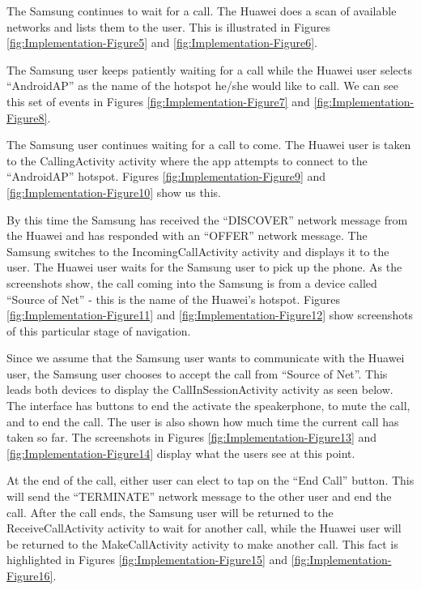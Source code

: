\documentclass[12pt,svgnames,smaller]{article} %
\begin{document}
		The Samsung continues to wait for a call. The Huawei does a scan of available networks and lists them to the user. This is illustrated in Figures \ref{fig:Implementation-Figure5} and \ref{fig:Implementation-Figure6}.

		The Samsung user keeps patiently waiting for a call while the Huawei user selects “AndroidAP” as the name of the hotspot he/she would like to call. We can see this set of events in Figures \ref{fig:Implementation-Figure7} and \ref{fig:Implementation-Figure8}.
	
		The Samsung user continues waiting for a call to come. The Huawei user is taken to the CallingActivity activity where the app attempts to connect to the “AndroidAP” hotspot. Figures \ref{fig:Implementation-Figure9} and \ref{fig:Implementation-Figure10} show us this.

		By this time the Samsung has received the “DISCOVER” network message from the Huawei and has responded with an “OFFER” network message. The Samsung switches to the IncomingCallActivity activity and displays it to the user. The Huawei user waits for the Samsung user to pick up the phone. As the screenshots show, the call coming into the Samsung is from a device called “Source of Net” - this is the name of the Huawei’s hotspot. Figures \ref{fig:Implementation-Figure11} and \ref{fig:Implementation-Figure12} show screenshots of this particular stage of navigation.

		Since we assume that the Samsung user wants to communicate with the Huawei user, the Samsung user chooses to accept the call from “Source of Net”. This leads both devices to display the CallInSessionActivity activity as seen below. The interface has buttons to end the activate the speakerphone, to mute the call, and to end the call. The user is also shown how much time the current call has taken so far. The screenshots in Figures \ref{fig:Implementation-Figure13} and \ref{fig:Implementation-Figure14} display what the users see at this point.

		At the end of the call, either user can elect to tap on the “End Call” button. This will send the “TERMINATE” network message to the other user and end the call. After the call ends, the Samsung user will be returned to the ReceiveCallActivity activity to wait for another call, while the Huawei user will be returned to the MakeCallActivity activity to make another call. This fact is highlighted in Figures \ref{fig:Implementation-Figure15} and \ref{fig:Implementation-Figure16}.
\end{document}
